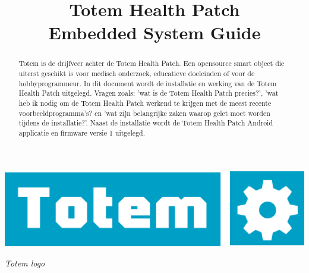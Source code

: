 \documentclass[conference]{IEEEtran}
\begin{document}
\title{Totem Health Patch\\Embedded System Guide}

\author{
}

\maketitle

\begin{center}
    \includegraphics[scale=0.9]{logototem}
    \begin{minipage}{0.6\textwidth}
    \footnotesize
    \emph{Totem logo}
    \end{minipage}
\end{center}

\begin{abstract}
Totem is de drijfveer achter de Totem Health Patch. Een opensource smart object die uiterst geschikt is voor medisch onderzoek, educatieve doeleinden of voor de hobbyprogrammeur. In dit document wordt de installatie en werking van de Totem Health Patch uitgelegd. Vragen zoals: 'wat is de Totem Health Patch precies?', 'wat heb ik nodig om de Totem Health Patch werkend te krijgen met de meest recente voorbeeldprogramma's? en 'wat zijn belangrijke zaken waarop gelet moet worden tijdens de installatie?'. Naast de installatie wordt de Totem Health Patch Android applicatie en firmware versie 1 uitgelegd.   
\end{abstract}

\IEEEpeerreviewmaketitle
\end{document}
